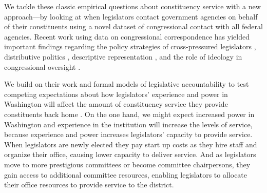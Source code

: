 \documentclass[12pt]{article}
\begin{document}


We tackle these classic empirical questions about constituency service with a new approach---by looking at when legislators contact government agencies on behalf of their constituents using a novel dataset of congressional contact with all federal agencies.  Recent work using data on congressional correspondence has yielded important findings regarding the policy strategies of cross-pressured legislators \citep{Ritchie2017}, distributive politics \citep{MillsKalafHuges2015}, descriptive representation \citep{LowandeRitchieLauterbach2018}, and the role of ideology in congressional oversight \citep{Lowande2018JOP}.  

We build on their work and formal models of legislative accountability to test competing expectations about how legislators' experience and power in Washington will affect the amount of constituency service they provide constituents back home \citep{AshworthBuenodeMesquita2006}.  On the one hand, we might expect increased power in Washington and experience in the institution will increase the levels of service, because experience and power increases legislators' capacity to provide service.  When legislators are newly elected they pay start up costs as they hire staff and organize their office, causing lower capacity to deliver service.  And as legislators move to more prestigious committees or become committee chairpersons, they gain access to additional committee resources, enabling legislators to allocate their office resources to provide service to the district.  
\end{document}
